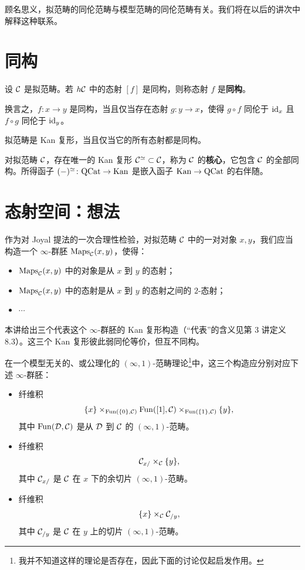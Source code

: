 \nitem\label{L4-4.5} 顾名思义，拟范畴的同伦范畴与模型范畴的同伦范畴有关。我们将在以后的讲次中解释这种联系。

\section{同构}

\begin{definition}\label{L4-5.1}
设 $\mathcal{C}$ 是拟范畴。若 $h\mathcal{C}$ 中的态射 $[f]$ 是同构，则称态射 $f$ 是\textbf{同构}。
\end{definition}

\nitem\label{L4-5.2} 换言之，$f\colon x\to y$ 是同构，当且仅当存在态射 $g\colon y\to x$，使得 $g\circ f$ 同伦于 $\operatorname{id}_x$ 且 $f\circ g$ 同伦于 $\operatorname{id}_y$。

\begin{exercise}\label{L4-5.3}
拟范畴是 Kan 复形，当且仅当它的所有态射都是同构。
\end{exercise}

\begin{exercise}\label{L4-5.4}
对拟范畴 $\mathcal{C}$，存在唯一的 Kan 复形 $\mathcal{C}^{\simeq}\subset\mathcal{C}$，称为 $\mathcal{C}$ 的\textbf{核心}，它包含 $\mathcal{C}$ 的全部同构。所得函子 $(-)^{\simeq}\colon\mathrm{QCat}\to\operatorname{Kan}$ 是嵌入函子 $\operatorname{Kan}\to\mathrm{QCat}$ 的右伴随。
\end{exercise}

\section{态射空间：想法}

\nitem\label{L4-6.1} 作为对 Joyal 提法的一次合理性检验，对拟范畴 $\mathcal{C}$ 中的一对对象 $x,y$，我们应当构造一个 $\infty$-群胚 $\mathrm{Maps}_{\mathcal{C}}(x,y)$，使得：
\begin{itemize}[leftmargin=2.2em,itemsep=0.1em]
\item $\mathrm{Maps}_{\mathcal{C}}(x,y)$ 中的对象是从 $x$ 到 $y$ 的态射；
\item $\mathrm{Maps}_{\mathcal{C}}(x,y)$ 中的态射是从 $x$ 到 $y$ 的态射之间的 $2$-态射；
\item $\cdots$
\end{itemize}
本讲给出三个代表这个 $\infty$-群胚的 Kan 复形构造（“代表”的含义见第 3 讲定义 8.3）。这三个 Kan 复形彼此弱同伦等价，但互不同构。

\nitem\label{L4-6.2} 在一个模型无关的、或公理化的 $(\infty,1)$-范畴理论\footnote{我并不知道这样的理论是否存在，因此下面的讨论仅起启发作用。}中，这三个构造应分别对应下述 $\infty$-群胚：
\begin{itemize}[leftmargin=2.6em,itemsep=0.15em,label={}]
\item[(B)] 纤维积
\[
\{x\}\times_{\operatorname{Fun}(\{0\},\mathcal{C})}\operatorname{Fun}([1],\mathcal{C})\times_{\operatorname{Fun}(\{1\},\mathcal{C})}\{y\},
\]
其中 $\operatorname{Fun}(\mathcal{D},\mathcal{C})$ 是从 $\mathcal{D}$ 到 $\mathcal{C}$ 的 $(\infty,1)$-范畴。
\item[(L)] 纤维积
\[
\mathcal{C}_{x/}\times_{\mathcal{C}}\{y\},
\]
其中 $\mathcal{C}_{x/}$ 是 $\mathcal{C}$ 在 $x$ 下的余切片 $(\infty,1)$-范畴。
\item[(R)] 纤维积
\[
\{x\}\times_{\mathcal{C}}\mathcal{C}_{/y},
\]
其中 $\mathcal{C}_{/y}$ 是 $\mathcal{C}$ 在 $y$ 上的切片 $(\infty,1)$-范畴。
\end{itemize}

